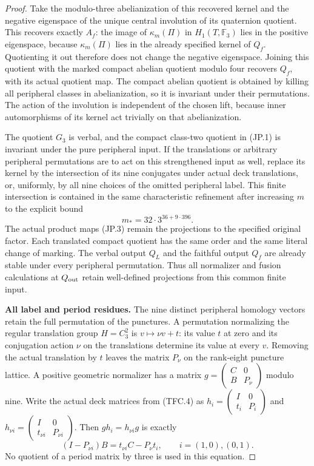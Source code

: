 \begin{proof}
Take the modulo-three abelianization of this recovered kernel
and the negative eigenspace of the unique central involution
of its quaternion quotient.  This recovers exactly $A_f$:
the image of $\kappa_m(\Pi)$ in $H_1(T,\mathbb F_3)$ lies in
the positive eigenspace, because $\kappa_m(\Pi)$ lies in the
already specified kernel of $Q_f$.  Quotienting it out therefore
does not change the negative eigenspace.  Joining this quotient
with the marked compact abelian quotient modulo four recovers
$Q_f$, with its actual quotient map.  The compact abelian
quotient is obtained by killing all peripheral classes in
abelianization, so it is invariant under their permutations.
The action of the involution is independent of the chosen lift,
because inner automorphisms of its kernel act trivially on
that abelianization.

The quotient $G_3$ is verbal, and the compact class-two
quotient in (JP.1) is invariant under the pure peripheral
input.  If the translations or arbitrary peripheral
permutations are to act on this strengthened input as well,
replace its kernel by the intersection of its nine conjugates
under actual deck translations, or, uniformly, by all nine
choices of the omitted peripheral label.  This finite
intersection is contained in the same characteristic
refinement after increasing $m$ to the explicit bound
\[
                    m_*=32\cdot3^{36+9\cdot396}.        \tag{JP.9}
\]
The actual product maps (JP.3) remain the projections to the
specified original factor.  Each translated compact quotient
has the same order and the same literal change of marking.
The verbal output $Q_L$ and the faithful output $Q_f$ are
already stable under every peripheral permutation.  Thus all
normalizer and fusion calculations at $Q_{\rm out}$ retain
well-defined projections from this common finite input.

\par\medskip\noindent\textbf{All label and period residues.}\quad
The nine distinct peripheral homology vectors retain the full
permutation of the punctures.  A permutation normalizing the
regular translation group $H=C_3^2$ is $v\mapsto\nu v+t$:
its value $t$ at zero and its conjugation action $\nu$ on the
translations determine its value at every $v$.  Removing the
actual translation by $t$ leaves the matrix $P_\nu$ on the
rank-eight puncture lattice.  A positive geometric normalizer
has a matrix $g=\left(\begin{smallmatrix}C&0\\B&P_\nu
\end{smallmatrix}\right)$ modulo nine.  Write the actual deck
matrices from (TFC.4) as
$h_i=\left(\begin{smallmatrix}I&0\\t_i&P_i
\end{smallmatrix}\right)$ and
$h_{\nu i}=\left(\begin{smallmatrix}I&0\\t_{\nu i}&P_{\nu i}
\end{smallmatrix}\right)$.  Then $g h_i=h_{\nu i}g$ is exactly
\[
 (I-P_{\nu i})B=t_{\nu i}C-P_\nu t_i,
 \qquad i=(1,0),(0,1).                                 \tag{JP.10}
\]
No quotient of a period matrix by three is used in this equation.


\end{proof}
